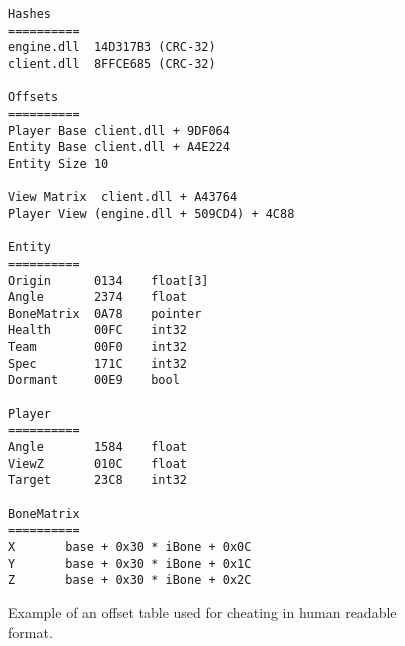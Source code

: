 \begin{figure}
\begin{verbatim}
Hashes
==========
engine.dll	14D317B3 (CRC-32)
client.dll	8FFCE685 (CRC-32)
 
Offsets
==========
Player Base	client.dll + 9DF064
Entity Base	client.dll + A4E224
Entity Size	10
 
View Matrix	 client.dll + A43764
Player View	(engine.dll + 509CD4) + 4C88
 
Entity
==========
Origin		0134	float[3]
Angle		2374	float
BoneMatrix	0A78	pointer
Health		00FC	int32
Team		00F0	int32
Spec		171C	int32
Dormant		00E9	bool
 
Player
==========
Angle		1584	float
ViewZ		010C	float
Target		23C8	int32
 
BoneMatrix
==========
X		base + 0x30 * iBone + 0x0C
Y		base + 0x30 * iBone + 0x1C
Z		base + 0x30 * iBone + 0x2C
\end{verbatim}
\caption{Example of an offset table used for cheating in human readable format.\cite{offsets}}
\label{fig:offsets}
\end{figure}